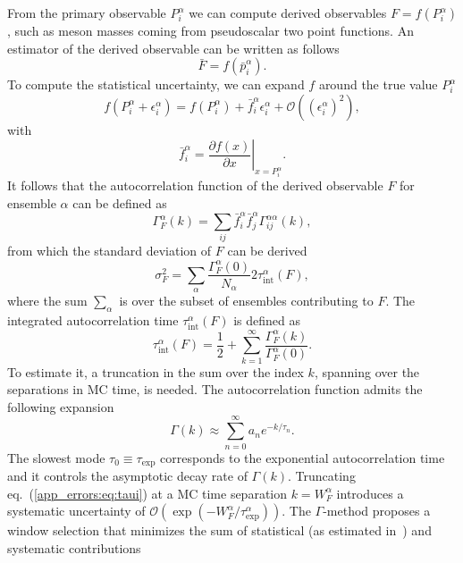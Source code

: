 From the primary observable $P_i^{\alpha}$ we can compute derived observables $F=f(P_i^{\alpha})$, such as meson masses coming from pseudoscalar two point functions. An estimator of the derived observable can be written as follows
\begin{equation}
\bar{F}=f(\bar{p}_i^{\alpha}).
\end{equation}
To compute the statistical uncertainty, we can expand $f$ around the true value $P_i^{\alpha}$
\begin{equation}
f(P_{i}^{\alpha}+\epsilon_{i}^{\alpha})=f(P_{i}^{\alpha})+\bar{f}_i^{\alpha}\epsilon_{i}^{\alpha}+\mathcal{O}((\epsilon_{i}^{\alpha})^2),
\end{equation}
with
\begin{equation}
\bar{f}_i^{\alpha}=\left.\frac{\partial f(x)}{\partial x}\right|_{x=P_{i}^{\alpha}}.
\end{equation}
It follows that the autocorrelation function of the derived observable $F$ for ensemble $\alpha$ can be defined as
\begin{equation}
\Gamma_F^{\alpha}(k)=\sum_{ij}\bar{f}_i^{\alpha}\bar{f}_j^{\alpha}\Gamma_{ij}^{\alpha\alpha}(k),
\end{equation}
from which the standard deviation of $F$ can be derived
\begin{equation}
\sigma_F^2=\sum_{\alpha}\frac{\Gamma_F^{\alpha}(0)}{N_{\alpha}}2\tau_{\textrm{int}}^{\alpha}(F),
\end{equation}
where the sum $\sum_{\alpha}$ is over the subset of ensembles contributing to $F$. The integrated autocorrelation time $\tau_{\textrm{int}}^{\alpha}(F)$ is defined as
\begin{equation}
\label{app_errors:eq:taui}
\tau_{\textrm{int}}^{\alpha}(F)=\frac{1}{2}+\sum_{k=1}^{\infty}\frac{\Gamma_F^{\alpha}(k)}{\Gamma_F^{\alpha}(0)}.
\end{equation}
To estimate it, a truncation in the sum over the index $k$, spanning over the separations in MC time, is needed. The autocorrelation function admits the following expansion~\citep{Luscher:2011kk,Schaefer:2010hu}
\begin{equation}
\Gamma(k)\approx\sum_{n=0}^{\infty}a_ne^{-k/\tau_n}.
\end{equation}
The slowest mode $\tau_0\equiv\tau_{\textrm{exp}}$ corresponds to the exponential autocorrelation time and it controls the asymptotic decay rate of $\Gamma(k)$. Truncating eq.~(\ref{app_errors:eq:taui}) at a MC time separation $k=W_F^{\alpha}$ introduces a systematic uncertainty of $\mathcal{O}(\exp(-W_F^{\alpha}/\tau_{\textrm{exp}}^{\alpha}))$. The $\Gamma$-method proposes a window selection that minimizes the sum of statistical (as estimated in~\citep{Madras:1988ei}) and systematic contributions
